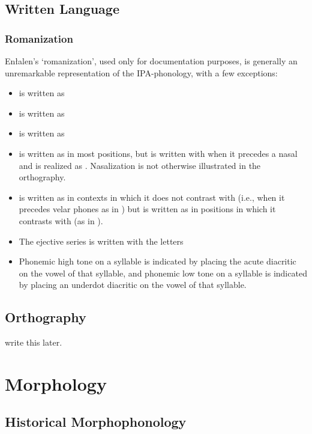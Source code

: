 \section{Written Language}

\subsection{Romanization}

Enłalen's `romanization', used only for documentation purposes, is generally an unremarkable representation of the IPA-phonology, with a few exceptions:
\begin{itemize}
    \item {} is written as 
    \item \phipa{\pharox\dwnwrd} is written as 
    \item \phipa{\vell} is written as 
    \item {} is written as  in most positions, but is written with  when it precedes a nasal and is realized as . Nasalization is not otherwise illustrated in the orthography.
    \item \phipa{\engma} is written as  in contexts in which it does not contrast with  (i.e., when it precedes velar phones as in  ) but is written as \ortho{\engga} in positions in which it contrasts with  (as in  ).
    \item The ejective series  is written with the letters \ortho{\ppa{} \tta{} \kka{}}
    \item Phonemic high tone on a syllable is indicated by placing the acute diacritic on the vowel of that syllable, and phonemic low tone on a syllable is indicated by placing an underdot diacritic on the vowel of that syllable.
\end{itemize}

\section{Orthography}

write this later.


\chapter{Morphology}

\section{Historical Morphophonology}

